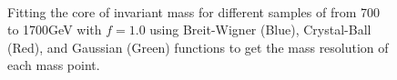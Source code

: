\begin{figure}[h!]
  \\ 
 \caption{Fitting the core of \qstar invariant mass for different samples of \mqstar from 700 to 1700\unit{GeV} with $f=1.0$ using Breit-Wigner 
(Blue), Crystal-Ball (Red), and Gaussian (Green) functions to get the mass resolution of each mass point.}
 \label{fig:fitQstarMass}
\end{figure}
